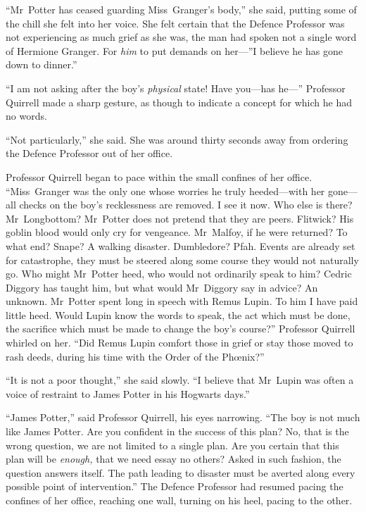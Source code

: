 “Mr~Potter has ceased guarding Miss~Granger’s body,” she said, putting some of the chill she felt into her voice. She felt certain that the Defence Professor was not experiencing as much grief as she was, the man had spoken not a single word of Hermione Granger. For \emph{him} to put demands on her—”I believe he has gone down to dinner.”

“I am not asking after the boy’s \emph{physical} state! Have you—has he—” Professor Quirrell made a sharp gesture, as though to indicate a concept for which he had no words.

“Not particularly,” she said. She was around thirty seconds away from ordering the Defence Professor out of her office.

Professor Quirrell began to pace within the small confines of her office. “Miss~Granger was the only one whose worries he truly heeded—with her gone—all checks on the boy’s recklessness are removed. I see it now. Who else is there? Mr~Longbottom? Mr~Potter does not pretend that they are peers. Flitwick? His goblin blood would only cry for vengeance. Mr~Malfoy, if he were returned? To what end? Snape? A walking disaster. Dumbledore? Pfah. Events are already set for catastrophe, they must be steered along some course they would not naturally go. Who might Mr~Potter heed, who would not ordinarily speak to him? Cedric Diggory has taught him, but what would Mr~Diggory say in advice? An unknown. Mr~Potter spent long in speech with Remus Lupin. To him I have paid little heed. Would Lupin know the words to speak, the act which must be done, the sacrifice which must be made to change the boy’s course?” Professor Quirrell whirled on her. “Did Remus Lupin comfort those in grief or stay those moved to rash deeds, during his time with the Order of the Phœnix?”

“It is not a poor thought,” she said slowly. “I believe that Mr~Lupin was often a voice of restraint to James Potter in his Hogwarts days.”

“James Potter,” said Professor Quirrell, his eyes narrowing. “The boy is not much like James Potter. Are you confident in the success of this plan? No, that is the wrong question, we are not limited to a single plan. Are you certain that this plan will be \emph{enough,} that we need essay no others? Asked in such fashion, the question answers itself. The path leading to disaster must be averted along every possible point of intervention.” The Defence Professor had resumed pacing the confines of her office, reaching one wall, turning on his heel, pacing to the other.

